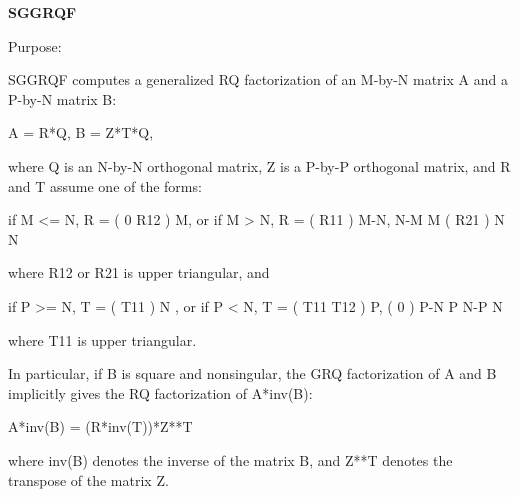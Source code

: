 {\bfseries S\+G\+G\+R\+Q\+F} 

 \begin{DoxyParagraph}{Purpose\+: }
\begin{DoxyVerb} SGGRQF computes a generalized RQ factorization of an M-by-N matrix A
 and a P-by-N matrix B:

             A = R*Q,        B = Z*T*Q,

 where Q is an N-by-N orthogonal matrix, Z is a P-by-P orthogonal
 matrix, and R and T assume one of the forms:

 if M <= N,  R = ( 0  R12 ) M,   or if M > N,  R = ( R11 ) M-N,
                  N-M  M                           ( R21 ) N
                                                      N

 where R12 or R21 is upper triangular, and

 if P >= N,  T = ( T11 ) N  ,   or if P < N,  T = ( T11  T12 ) P,
                 (  0  ) P-N                         P   N-P
                    N

 where T11 is upper triangular.

 In particular, if B is square and nonsingular, the GRQ factorization
 of A and B implicitly gives the RQ factorization of A*inv(B):

              A*inv(B) = (R*inv(T))*Z**T

 where inv(B) denotes the inverse of the matrix B, and Z**T denotes the
 transpose of the matrix Z.\end{DoxyVerb}
 
\end{DoxyParagraph}

